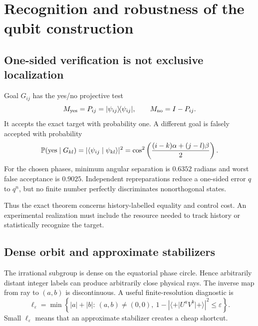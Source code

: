 \documentclass[11pt]{article}
\theoremstyle{definition}
\theoremstyle{remark}
\newcommand{\Prob}{\mathbb P}
\newcommand{\ket}[1]{\lvert #1\rangle}
\newcommand{\bra}[1]{\langle #1\rvert}
\newcommand{\braket}[2]{\langle #1\mid #2\rangle}
\newcommand{\proj}[1]{\lvert #1\rangle\!\langle #1\rvert}
\begin{document}
\section{Recognition and robustness of the qubit construction}
\label{sec:qubit-robustness}

\subsection{One-sided verification is not exclusive localization}

Goal $G_{ij}$ has the yes/no projective test
\begin{equation}
 M_{\rm yes}=P_{ij}=\proj{\psi_{ij}},\qquad
 M_{\rm no}=I-P_{ij}.
\end{equation}
It accepts the exact target with probability one. A different goal is falsely
accepted with probability
\begin{equation}
 \Prob({\rm yes}\mid G_{kl})
 =|\braket{\psi_{ij}}{\psi_{kl}}|^2
 =\cos^2\left(
 \frac{(i-k)\alpha+(j-l)\beta}{2}
 \right).
 \label{eq:false-accept}
\end{equation}
For the chosen phases, minimum angular separation is $0.6352$ radians and
worst false acceptance is $0.9025$. Independent repreparations reduce a
one-sided error $q$ to $q^n$, but no finite number perfectly discriminates
nonorthogonal states.

Thus the exact theorem concerns history-labelled equality and control cost.
An experimental realization must include the resource needed to track history
or statistically recognize the target.

\subsection{Dense orbit and approximate stabilizers}

The irrational subgroup is dense on the equatorial phase circle. Hence
arbitrarily distant integer labels can produce arbitrarily close physical
rays. The inverse map from ray to $(a,b)$ is discontinuous. A useful
finite-resolution diagnostic is
\begin{equation}
 \ell_\varepsilon=
 \min\left\{|a|+|b|:\ (a,b)\ne(0,0),\
 1-|\bra+U^aV^b\ket+|^2\le\varepsilon\right\}.
 \label{eq:approx-stabilizer}
\end{equation}
Small $\ell_\varepsilon$ means that an approximate stabilizer creates a cheap
shortcut.
\end{document}
